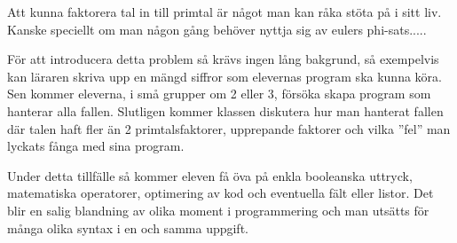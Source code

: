     \textcolor{WildStrawberry}{
        Att kunna faktorera tal in till primtal är något man kan råka stöta på i sitt liv. Kanske speciellt om man någon gång behöver nyttja sig av eulers phi-sats.....  }
        
    \textcolor{WildStrawberry}{
        För att introducera detta problem så krävs ingen lång bakgrund, så exempelvis kan läraren skriva upp en mängd siffror som elevernas program ska kunna köra. Sen kommer eleverna, i små grupper om 2 eller 3, försöka skapa program som hanterar alla fallen. Slutligen kommer klassen diskutera hur man hanterat fallen där talen haft fler än 2 primtalsfaktorer, upprepande faktorer och vilka ''fel'' man lyckats fånga med sina program. }
        
    \textcolor{WildStrawberry}{
        Under detta tillfälle så kommer eleven få öva på enkla booleanska uttryck, matematiska operatorer, optimering av kod och eventuella fält eller listor. Det blir en salig blandning av olika moment i programmering och man utsätts för många olika syntax i en och samma uppgift.}